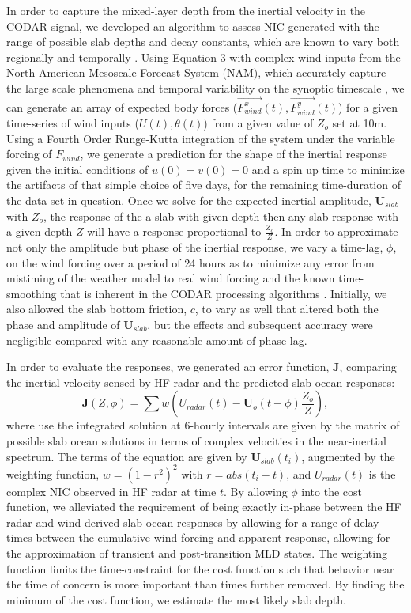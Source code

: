 \documentclass{article}
\begin{document}
In order to capture the mixed-layer depth from the inertial velocity in the CODAR signal, we developed an algorithm to assess NIC generated with the range of possible slab depths and decay constants, which are known to vary both regionally and temporally \cite{DAsaro1989,MacKinnon2005,Zhang2014,Park2009}.
Using Equation 3 with complex wind inputs from the North American Mesoscale Forecast System (NAM), which accurately capture the large scale phenomena and temporal variability on the synoptic timescale \cite{Rife2005}, we can generate an array of expected body forces ($\overrightarrow{F^x_{wind}}(t),\overrightarrow{F^y_{wind}}(t)$) for a given time-series of wind inputs ($U(t),\theta(t)$) from a given value of $Z_o$ set at 10m.
Using a Fourth Order Runge-Kutta integration of the system under the variable forcing of $F_{wind}$, we generate a prediction for the shape of the inertial response given the initial conditions of $u(0)=v(0)=0$ and a spin up time to minimize the artifacts of that simple choice of five days, for the remaining time-duration of the data set in question.
Once we solve for the expected inertial amplitude, $\mathbf{U}_{slab}$  with $Z_o$, the response of the a slab with given depth then any slab response with a given depth $Z$ will have a response proportional to $\tfrac{Z_o}{Z}$.
In order to approximate not only the amplitude but phase of the inertial response, we vary a time-lag, $\phi$, on the wind forcing over a period of 24 hours as to minimize any error from mistiming of the weather model to real wind forcing and the known time-smoothing that is inherent in the CODAR processing algorithms \cite{Roarty:2010:0025-3324:133}.
Initially, we also allowed the slab bottom friction, $c$, to vary as well that altered both the phase and amplitude of $\mathbf{U}_{slab}$, but the effects and subsequent accuracy were negligible compared with any reasonable amount of phase lag. 

In order to evaluate the responses, we generated an error function, $\mathbf{J}$, comparing the inertial velocity sensed by HF radar and the predicted slab ocean responses:
\begin{equation}
    \mathbf{J}(Z,\phi) = \sum w \left(  U_{radar}(t) - 
    \mathbf{U}_{o}(t-\phi)\frac{Z_o}{Z} \right),
\end{equation}
where use the integrated solution at 6-hourly intervals are given by the matrix of possible slab ocean solutions in terms of complex velocities in the near-inertial spectrum.
The terms of the equation are given by $\mathbf{U}_{slab}(t_i)$, augmented by the weighting function, $w = {(1-r^2)}^2$ with $r = abs(t_i - {t})$, and $U_{radar}({t})$ is the complex NIC observed in HF radar at time $t$.
By allowing $\phi$ into the cost function, we alleviated the requirement of being exactly in-phase between the HF radar and wind-derived slab ocean responses by allowing for a range of delay times between the cumulative wind forcing and apparent response, allowing for the approximation of transient and post-transition MLD states.
The weighting function limits the time-constraint for the cost function such that behavior near the time of concern is more important than times further removed. 
By finding the minimum of the cost function, we estimate the most likely slab depth. 
\end{document}
